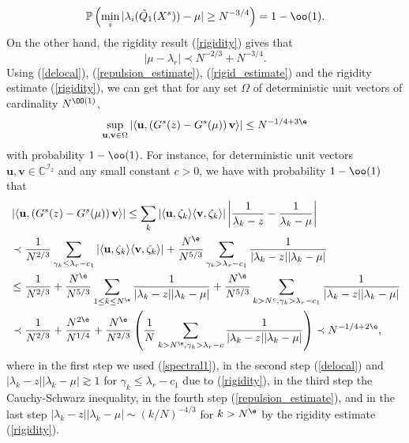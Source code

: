 \begin{equation}\label{repulsion_estimate}
\mathbb P\left( \min_{i}|\lambda_i(\tilde Q_1(X^s) ) - \mu| \ge N^{-3/4} \right) = 1-\oo(1).
\end{equation}
On the other hand, the rigidity result (\ref{rigidity}) gives that %
\begin{equation}\label{rigid_estimate}
|\mu - \lambda_r | \prec N^{-2/3} + N^{-3/4}.
\end{equation}
Using (\ref{delocal}), (\ref{repulsion_estimate}), (\ref{rigid_estimate}) and the rigidity estimate (\ref{rigidity}), we can get that for any set $\Omega$ of deterministic unit vectors of cardinality $N^{\OO(1)}$, %
\begin{equation}
\sup_{\mathbf u,\mathbf v\in \Omega}\left\vert \left\langle \mathbf u, \left(G^{s}(z)-G^{s}(\mu)\right) \mathbf v\right\rangle \right\vert \le N^{-{1}/{4}+3\e} \label{REALCOMPLEX}
\end{equation}
with probability $1-\oo(1)$. For instance, for deterministic unit vectors $\mathbf u,\mathbf v \in \mathbb C^{\mathcal I_2}$ and any small constant $c>0$, we have with probability $1-\oo(1)$ that
\begin{align*}
& \left| \left\langle \mathbf u, \left(G^{s}(z)-G^{s}(\mu)\right) \mathbf v\right\rangle\right|  \le \sum_{k} \left|\langle \mathbf u, \zeta_k \rangle \langle \mathbf v, \zeta_k\rangle \right|\left| \frac{1}{\lambda_k - z} - \frac{1}{\lambda_k - \mu}\right| \\
& \prec \frac{1}{N^{2/3}}\sum_{\gamma_k \le \lambda_r- c_1} \left|\langle \mathbf u, \zeta_k \rangle \langle \mathbf v, \zeta_k\rangle \right| +  \frac{N^\e}{N^{5/3}}\sum_{ \gamma_k > \lambda_r - c_1} \frac{1}{|\lambda_k - z||\lambda_k - \mu|}  \\
& \le \frac{1}{N^{2/3}} + \frac{N^\e}{N^{5/3}}\sum_{1\le k \le N^\e} \frac{1}{|\lambda_k - z||\lambda_k - \mu|} + \frac{N^\e}{N^{5/3}}\sum_{k> N^c, \gamma_k>\lambda_r - c_1} \frac{1}{|\lambda_k - z||\lambda_k - \mu|} \\
& \prec \frac{1}{N^{2/3}} + \frac{N^{2\e}}{N^{1/4}} + \frac{N^\e}{N^{2/3}}\left(\frac{1}{N}\sum_{k> N^\e, \gamma_k>\lambda_r - c} \frac{1}{|\lambda_k - z||\lambda_k - \mu|}\right) \prec N^{-1/4+2\e},
\end{align*}
where in the first step we used (\ref{spectral1}), in the second step (\ref{delocal}) and $|\lambda_k - z||\lambda_k - \mu| \gtrsim 1$ for $\gamma_k \le \lambda_r-c_1$ due to (\ref{rigidity}), in the third step the Cauchy-Schwarz inequality, in the fourth step (\ref{repulsion_estimate}), and in the last step $|\lambda_k - z||\lambda_k - \mu| \sim (k/N)^{-4/3}$ for $k>N^\e$ by the rigidity estimate (\ref{rigidity}). %
